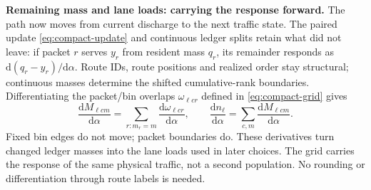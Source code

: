 \documentclass[10pt,a4paper]{article}
\newcommand{\rev}[1]{{\color{revisionred}#1}}
\begin{document}
\textbf{\rev{Remaining mass and lane loads: carrying the response forward.}}
The path now moves from current discharge to the next traffic state.
The paired update \rev{\eqref{eq:compact-update}} and continuous ledger splits
retain what did not leave: if packet $r$ serves $y_r$ from resident mass
$q_r$, its remainder responds as $\mathrm d(q_r-y_r)/\mathrm d\alpha$.
Route IDs, route positions and realized order stay structural; continuous
masses determine the shifted cumulative-rank boundaries.
Differentiating the packet/bin overlaps $\omega_{\ell cr}$ defined in
\rev{\eqref{eq:compact-grid}} gives
\begin{equation}
 \frac{\mathrm dM_{\ell cm}}{\mathrm d\alpha}
 =\sum_{r:m_r=m}\frac{\mathrm d\omega_{\ell cr}}{\mathrm d\alpha},
 \qquad
 \frac{\mathrm dn_\ell}{\mathrm d\alpha}
 =\sum_{c,m}\frac{\mathrm dM_{\ell cm}}{\mathrm d\alpha}.
 \label{eq:compact-grid-derivative}
\end{equation}
Fixed bin edges do not move; packet boundaries do. \rev{These derivatives
turn changed ledger masses into the lane loads used in later choices.}
The grid carries the response of the same physical traffic, not a second
population. No rounding or differentiation through route labels is needed.
\end{document}
